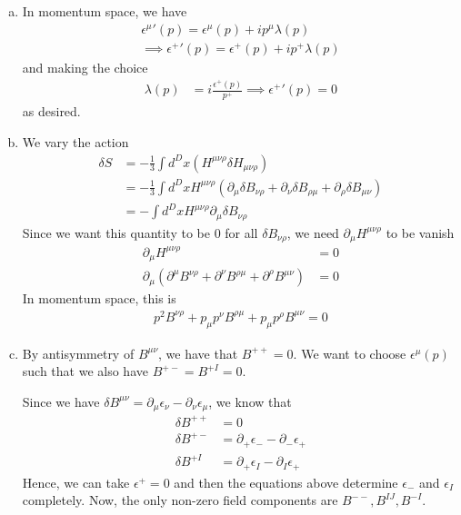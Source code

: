 \documentclass[11pt]{article}
\begin{document}
\begin{enumerate} [(a)]
    \item In momentum space, we have  
    \begin{align*}
        {\epsilon^\mu}'(p) = \epsilon^\mu (p) + ip^\mu \lambda(p) \\
        \implies {\epsilon^+}' (p) = {\epsilon^+} (p) + i{p^+} \lambda(p)
    \end{align*}
    and making the choice 
    \begin{align*}
        \lambda(p) &= i \frac{\epsilon^+(p)}{p^+} \implies {\epsilon^+}'(p) = 0 
    \end{align*}
    as desired. 

    \item We vary the action
    \begin{align*}
        \delta S &= -\frac{1}{3}\int d^D x \left(H^{\mu\nu\rho} \delta H_{\mu\nu\rho} \right) \\
        &= - \frac{1}{3} \int d^D x H^{\mu\nu\rho} (\partial_\mu \delta B_{\nu\rho} +\partial_\nu \delta B_{\rho\mu} +\partial_\rho \delta B_{\mu\nu }) \\
        &= - \int d^D x H^{\mu\nu\rho} \partial_\mu \delta B_{\nu \rho} \tag{reordering and relabelling}    
    \end{align*}
    Since we want this quantity to be 0 for all $\delta B_{\nu \rho}$, we need $\partial_\mu H^{\mu\nu\rho}$ to  be vanish
    \begin{align*}
        \partial_\mu H^{\mu\nu\rho} &= 0 \\
        \partial_\mu  (\partial^\mu B^{\nu\rho} + \partial^\nu B^{\rho\mu} + \partial^\rho B^{\mu\nu }) &= 0 
    \end{align*}
    In momentum space, this is 
    \begin{align*}
        p^2 B^{\nu \rho} + p_\mu p^\nu B^{\rho \mu } + p_\mu p^\rho B^{\mu \nu} = 0 
    \end{align*}

    \item By antisymmetry of $B^{\mu\nu}$, we have that $B^{++} = 0$. We want to choose $\epsilon^\mu(p)$ such that we also have $B^{+-} = B^{+I} = 0$.
    
    Since we have $\delta B^{\mu\nu} = \partial_\mu \epsilon_\nu - \partial_\nu \epsilon_\mu$, we know that 
    \begin{align*}
        \delta B^{++} &= 0 \\
        \delta B^{+-} &= \partial_+ \epsilon_- - \partial_- \epsilon_+ \\
        \delta B^{+I} &= \partial_+ \epsilon_I - \partial_I \epsilon_+ 
    \end{align*}
    Hence, we can take $\epsilon^+ = 0$ and then the equations above determine $\epsilon_-$ and $\epsilon_I$ completely. Now, the only non-zero field components are $B^{--}, B^{IJ}, B^{-I}$. 


\end{enumerate}
\end{document}
